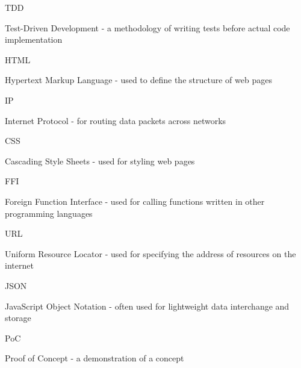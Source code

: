 \documentclass[]{final}
\begin{document}
TDD

Test-Driven Development - a methodology of writing tests before actual code implementation

HTML

Hypertext Markup Language - used to define the structure of web pages

IP

Internet Protocol - for routing data packets across networks

CSS

Cascading Style Sheets - used for styling web pages

FFI

Foreign Function Interface - used for calling functions written in other programming languages

URL

Uniform Resource Locator - used for specifying the address of resources on the internet

JSON

JavaScript Object Notation - often used for lightweight data interchange and storage

PoC

Proof of Concept - a demonstration of a concept
\end{document}

